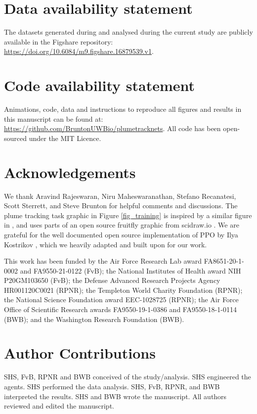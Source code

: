 \documentclass[5p,twocolumn,authoryear]{elsarticle}
\begin{document}
\clearpage
\section*{Data availability statement}
The datasets generated during and analysed during the current study are publicly available in the Figshare repository: \\ \url{https://doi.org/10.6084/m9.figshare.16879539.v1}.

\section*{Code availability statement}
Animations, code, data and instructions to reproduce all figures and results in this manuscript can be found at: \\ \url{https://github.com/BruntonUWBio/plumetracknets}.
All code has been open-sourced under the MIT Licence.


\section*{Acknowledgements}
We thank Aravind Rajeswaran, Niru Maheswaranathan, Stefano Recanatesi, Scott Sterrett, and Steve Brunton for helpful comments and discussions.
The plume tracking task graphic in Figure \ref{fig_training} is inspired by a similar figure in \cite{baker2018algorithms}, and uses parts of an open source fruitfly graphic from scidraw.io \citep{costa_gil_2020_3926137}.
We are grateful for the well documented open source implementation of PPO by Ilya Kostrikov \citep{kostrikov2018pytorch}, which we heavily adapted and built upon for our work.

This work has been funded by 
the Air Force Research Lab award FA8651-20-1-0002 and FA9550-21-0122 (FvB); 
the National Institutes of Health award NIH P20GM103650 (FvB);
the Defense Advanced Research Projects Agency HR001120C0021 (RPNR); 
the Templeton World Charity Foundation (RPNR); 
the National Science Foundation award EEC-1028725 (RPNR); 
the Air Force Office of Scientific Research awards FA9550-19-1-0386 and FA9550-18-1-0114 (BWB); 
and the Washington Research Foundation (BWB).


\section*{Author Contributions}
SHS, FvB, RPNR and BWB conceived of the study/analysis. 
SHS engineered the agents. 
SHS performed the data analysis. 
SHS, FvB, RPNR, and BWB interpreted the results. 
SHS and BWB wrote the manuscript. 
All authors reviewed and edited the manuscript. 
\end{document}
